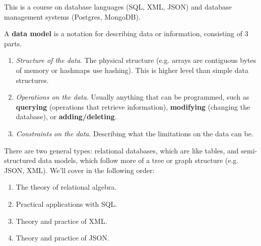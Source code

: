 This is a course on database languages (SQL, XML, JSON) and database management systems (Postgres, MongoDB). 

\begin{definition}
  A \textbf{data model} is a notation for describing data or information, consisting of 3 parts. 
  \begin{enumerate}
    \item \textit{Structure of the data}. The physical structure (e.g. arrays are contiguous bytes of memory or hashmaps use hashing). This is higher level than simple data structures. 
    \item \textit{Operations on the data}. Usually anything that can be programmed, such as \textbf{querying} (operations that retrieve information), \textbf{modifying} (changing the database), or \textbf{adding/deleting}. 
    \item \textit{Constraints on the data}. Describing what the limitations on the data can be. 
  \end{enumerate}
\end{definition}

There are two general types: relational databases, which are like tables, and semi-structured data models, which follow more of a tree or graph structure (e.g. JSON, XML). We'll cover in the following order: 
\begin{enumerate}
  \item The theory of relational algebra. 
  \item Practical applications with SQL. 
  \item Theory and practice of XML.  
  \item Theory and practice of JSON. 
\end{enumerate}

